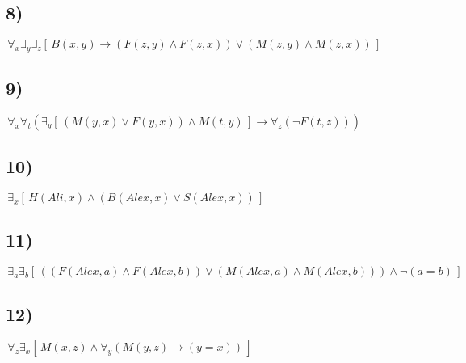 \documentclass[a4paper,12pt]{article}
\begin{document}
\begin{tcolorbox}
\subsection{8)}
\begin{center}
    $\,\forall_x \exists_y \exists_z [\, B(x,y)\rightarrow(F(z,y) \wedge F(z,x)) \vee(M(z,y) \wedge M(z,x))  \,] $ 
\end{center}
\subsection{9)}
\begin{center}
    $\,\forall_x \forall_t( \exists_y[\,( M(y,x) \vee F(y,x)) \wedge M(t,y)\,] \rightarrow \forall_z(\neg F(t,z))) $ 
\end{center}
\subsection{10)}
\begin{center}
    $\,\exists_x[\,H(Ali,x) \wedge (B(Alex,x) \vee S(Alex,x) )   \,]  $ 
\end{center}
\subsection{11)}
\begin{center}
    $\,\exists_a \exists_b [\,(( F(Alex,a) \wedge F(Alex,b))\vee ( M(Alex,a) \wedge M(Alex,b) )) \wedge \neg(a=b)\,] $ 
\end{center}
\subsection{12)}
\begin{center}
    $\,\forall_z \exists_x  [\, M(x,z)   \wedge \forall_y( M(y,z)\rightarrow (y=x))  \,] $ 
\end{center}


\end{tcolorbox}


\newpage
\end{document}
